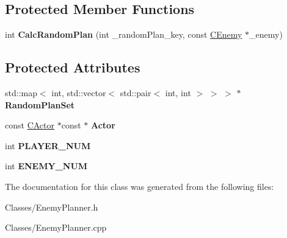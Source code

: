 \subsection*{Protected Member Functions}
\begin{DoxyCompactItemize}
\item 
int {\bfseries Calc\+Random\+Plan} (int \+\_\+random\+Plan\+\_\+key, const \hyperlink{class_c_enemy}{C\+Enemy} $\ast$\+\_\+enemy)\hypertarget{class_c_enemy_planner_a830dba5323b19e2534a361949bc785c3}{}\label{class_c_enemy_planner_a830dba5323b19e2534a361949bc785c3}

\end{DoxyCompactItemize}
\subsection*{Protected Attributes}
\begin{DoxyCompactItemize}
\item 
std\+::map$<$ int, std\+::vector$<$ std\+::pair$<$ int, int $>$ $>$ $>$ $\ast$ {\bfseries Random\+Plan\+Set}\hypertarget{class_c_enemy_planner_aa67925ceabbf73a42ca9b6d5d672b8bb}{}\label{class_c_enemy_planner_aa67925ceabbf73a42ca9b6d5d672b8bb}

\item 
const \hyperlink{class_c_actor}{C\+Actor} $\ast$const $\ast$ {\bfseries Actor}\hypertarget{class_c_enemy_planner_a8b8263d1eff7c1e301cf89a432acf169}{}\label{class_c_enemy_planner_a8b8263d1eff7c1e301cf89a432acf169}

\item 
int {\bfseries P\+L\+A\+Y\+E\+R\+\_\+\+N\+UM}\hypertarget{class_c_enemy_planner_a9bb42588ddd87d3773a2c206b62e80f3}{}\label{class_c_enemy_planner_a9bb42588ddd87d3773a2c206b62e80f3}

\item 
int {\bfseries E\+N\+E\+M\+Y\+\_\+\+N\+UM}\hypertarget{class_c_enemy_planner_a14c4bb52945b2755fb2230578ef761cd}{}\label{class_c_enemy_planner_a14c4bb52945b2755fb2230578ef761cd}

\end{DoxyCompactItemize}


The documentation for this class was generated from the following files\+:\begin{DoxyCompactItemize}
\item 
Classes/Enemy\+Planner.\+h\item 
Classes/Enemy\+Planner.\+cpp\end{DoxyCompactItemize}

